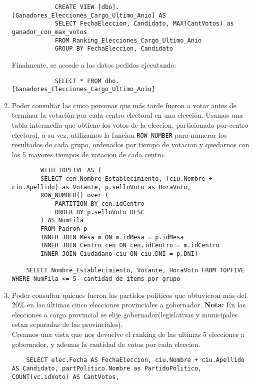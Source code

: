 \begin{enumerate}
		\begin{lstlisting}
			CREATE VIEW [dbo].[Ganadores_Elecciones_Cargo_Ultimo_Anio] AS
			SELECT FechaEleccion, Candidato, MAX(CantVotos) as ganador_con_max_votos
			FROM Ranking_Elecciones_Cargo_Ultimo_Anio
			GROUP BY FechaEleccion, Candidato
		\end{lstlisting}

		Finalmente, se accede a los datos pedidos ejecutando:
		\begin{lstlisting}
			SELECT * FROM dbo.[Ganadores_Elecciones_Cargo_Ultimo_Anio]
		\end{lstlisting}

	\item Poder consultar las cinco personas que más tarde fueron a votar antes de terminar
	la votación por cada centro electoral en una elección.
	Usamos una tabla intermedia que obtiene los votos de la eleccion, particionado por centro electoral, a su vez, utilizamos la funcion \texttt{ROW\_NUMBER} para numerar los resultados de cada grupo, ordenados por tiempo de votacion y quedarnos con los 5 mayores tiempos de votacion de cada centro.
	\begin{lstlisting}
		WITH TOPFIVE AS (
	    SELECT cen.Nombre_Establecimiento, (ciu.Nombre + ciu.Apellido) as Votante, p.selloVoto as HoraVoto,
	    ROW_NUMBER() over (
	        PARTITION BY cen.idCentro
	        ORDER BY p.selloVoto DESC
	    ) AS NumFila
	    FROM Padron p
	    INNER JOIN Mesa m ON m.idMesa = p.idMesa
	    INNER JOIN Centro cen ON cen.idCentro = m.idCentro
	    INNER JOIN Ciudadano ciu ON ciu.DNI = p.DNI)
	    
	SELECT Nombre_Establecimiento, Votante, HoraVoto FROM TOPFIVE WHERE NumFila <= 5--cantidad de items por grupo
	\end{lstlisting}

	\item Poder consultar quienes fueron los partidos políticos que obtuvieron más del 20\%
	en las últimas cinco elecciones provinciales a gobernador.
	\textbf{Nota:} En las elecciones a cargo provincial se elije gobernador(legislativas y municipales estan separadas de las provinciales).\\

Creamos una vista que nos devuelve el ranking de las ultimas 5 elecciones a gobernador, y ademas la cantidad de votos por cada eleccion.

\begin{lstlisting}
	SELECT elec.Fecha AS FechaEleccion, ciu.Nombre + ciu.Apellido AS Candidato, partPolitico.Nombre as PartidoPolitico, 
COUNT(vc.idVoto) AS CantVotos,  


\end{lstlisting}
\end{enumerate}
